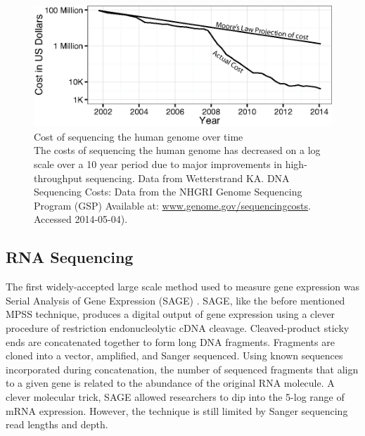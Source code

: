     \begin{figure} %
      \centering 
      \includegraphics{Figures/Intro/Sequencing_costs_over_time.eps}
      \caption[Cost of sequencing the human genome over time]
      {
        Cost of sequencing the human genome over time\\[0.25cm]
        The costs of sequencing the human genome has decreased on a log scale over a 10 year period due to major improvements in high-throughput sequencing. Data from Wetterstrand KA. DNA Sequencing Costs: Data from the NHGRI Genome Sequencing Program (GSP) Available at: \url{www.genome.gov/sequencingcosts}. Accessed 2014-05-04).
        }
      \label{Intro:fig:SeqCosts}
      \end{figure}

  \subsection{RNA Sequencing}
    \label{Intro:subsec:Types of HTS}

    The first widely-accepted large scale method used to measure gene expression was Serial Analysis of Gene Expression (SAGE) \citep{Velculescu1995a}. SAGE, like the before mentioned MPSS technique, produces a digital output of gene expression using a clever procedure of restriction endonucleolytic cDNA cleavage. Cleaved-product sticky ends are concatenated together to form long DNA fragments. 
    Fragments are cloned into a vector, amplified, and Sanger sequenced. Using known sequences incorporated during concatenation, the number of sequenced fragments that align to a given gene is related to the abundance of the original RNA molecule. A clever molecular trick, SAGE allowed researchers to dip into the 5-log range of mRNA expression. However, the technique is still limited by Sanger sequencing read lengths and depth.

